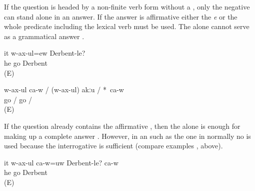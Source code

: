If the question is headed by a non-finite verb form without a , only the negative  can stand alone in an answer. If the answer is affirmative either the  \textit{e}  or the whole predicate including the lexical verb must be used. The  alone cannot serve as a grammatical answer .
%
\begin{exe}
	\ex	\label{ex:Is he going to Derbent}
	\gll	it	w-ax-ul=ew	Derbent-le?\\
		he	go	Derbent\\
	\glt	{} (E)

	\ex	\label{ex:He is going / not going}
	\gll	w-ax-ul		ca-w	/	(w-ax-ul)		akːu		/	*~ca-w\\
		go		/	go		/	{\hphantom{*}}~\\
	\glt	{} (E)
\end{exe}

If the question already contains the affirmative , then the  alone is enough for making up a complete answer . However, in an  such as the one in  normally no  is used because the interrogative  is sufficient (compare examples ,  above).
%
\begin{exe}
	\ex	\label{ex:Is he going to Derbent? Yes, he is}
	\gll	it	w-ax-ul	ca-w=uw	Derbent-le?	ca-w\\
		he	go		Derbent	\\
	\glt	{} (E)
\end{exe}

